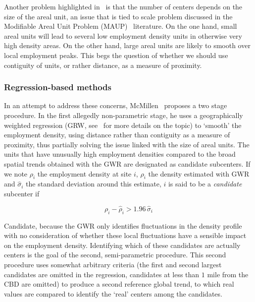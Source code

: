 Another problem highlighted in~\cite{Anas:1998} is that the number of centers
depends on the size of the areal unit, an issue that is tied to scale problem
discussed in the Modifiable Areal Unit Problem (MAUP)~\cite{Openshaw:1984}
literature. On the one hand, small areal units will lead to several low
employment density units in otherwise very high density areas. On the other
hand, large areal units are likely to smooth over local employment peaks. This
begs the question of whether we should use contiguity of units, or rather
distance, as a measure of proximity.


\subsubsection{Regression-based methods}
\label{ssub:regression_based_methods}

In an attempt to address these concerns, McMillen~\cite{McMillen:2001} proposes
a two stage procedure. In the first allegedly non-parametric stage, he uses a
geographically weighted regression (GRW, see~\cite{Brunsdon:1998} for more
details on the topic) to `smooth' the employment density, using distance rather
than contiguity as a measure of proximity, thus partially solving the issue
linked with the size of areal units.  The units that have unusually high
employment densities compared to the broad spatial trends obtained with the GWR are designated as
candidate subcenters. If we note $\rho_i$ the employment density at site $i$,
$\hat{\rho}_i$ the density estimated with GWR and $\hat{\sigma}_i$ the standard
deviation around this estimate, $i$ is said to be a \emph{candidate} subcenter
if 

\begin{equation*}
    \rho_i - \hat{\rho}_i > 1.96\,\hat{\sigma}_i
\end{equation*}

Candidate, because the GWR only identifies fluctuations in the density profile
with no consideration of whether these local fluctuations have a sensible impact
on the employment density. Identifying which of these candidates are actually
centers is the goal of the second, semi-parametric procedure. This second
procedure uses somewhat arbitrary criteria (the first and second largest
candidates are omitted in the regression, candidates at less than $1$ mile from
the CBD are omitted) to produce a second reference global trend, to which real values are
compared to identify the `real' centers among the candidates.\\

